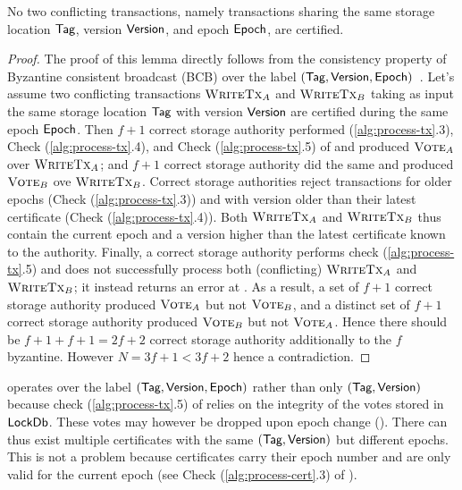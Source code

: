 \begin{lemma} \label{th:bcb-consistency}
    No two conflicting transactions, namely transactions sharing the same storage location $\textsf{Tag}$, version $\textsf{Version}$, and epoch $\textsf{Epoch}$, are certified.
\end{lemma}
\begin{proof}
    The proof of this lemma directly follows from the consistency property of Byzantine consistent broadcast (BCB) over the label $(\textsf{Tag}, \textsf{Version}, \textsf{Epoch})$~\cite{cachin2011introduction}.
    Let's assume two conflicting transactions $\textsc{WriteTx}_A$ and $\textsc{WriteTx}_B$ taking as input the same storage location $\textsf{Tag}$ with version $\textsf{Version}$ are certified during the same epoch $\textsf{Epoch}$.
    Then $f+1$ correct storage authority performed (\ref{alg:process-tx}.3), Check (\ref{alg:process-tx}.4), and Check (\ref{alg:process-tx}.5) of  and produced $\textsc{Vote}_A$ over $\textsc{WriteTx}_A$; and $f+1$ correct storage authority did the same and produced $\textsc{Vote}_B$ ove $\textsc{WriteTx}_B$.
    Correct storage authorities reject transactions for older epochs (Check (\ref{alg:process-tx}.3)) and with version older than their latest certificate (Check (\ref{alg:process-tx}.4)). Both $\textsc{WriteTx}_A$ and $\textsc{WriteTx}_B$ thus contain the current epoch and a version higher than the latest certificate known to the authority.
    Finally, a correct storage authority performs check (\ref{alg:process-tx}.5) and does not successfully process both (conflicting) $\textsc{WriteTx}_A$ and $\textsc{WriteTx}_B$; it instead returns an error at . As a result, a set of $f+1$ correct storage authority produced $\textsc{Vote}_A$ but not $\textsc{Vote}_B$, and a distinct set of $f+1$ correct storage authority produced $\textsc{Vote}_B$ but not $\textsc{Vote}_A$.
    Hence there should be $f+1+f+1=2f+2$ correct storage authority additionally to the $f$ byzantine. However $N=3f+1 < 3f+2$ hence a contradiction.
\end{proof}

 operates over the label $(\textsf{Tag}, \textsf{Version}, \textsf{Epoch})$ rather than only $(\textsf{Tag}, \textsf{Version})$ because check (\ref{alg:process-tx}.5) of  relies on the integrity of the votes stored in $\textsf{LockDb}$. These votes may however be dropped upon epoch change (). There can thus exist multiple certificates with the same $(\textsf{Tag}, \textsf{Version})$ but different epochs. This is not a problem because certificates carry their epoch number and are only valid for the current epoch (see Check (\ref{alg:process-cert}.3) of ).

